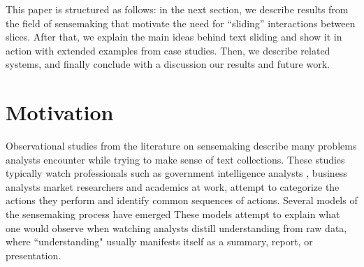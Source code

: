 \documentclass{sig-alternate}
\begin{document}
This paper is structured as follows: in the next section, we describe results from the field of sensemaking that motivate the need for ``sliding'' interactions between slices. After that, we explain the main ideas behind text sliding and show it in action with extended examples from case studies. Then, we describe related systems, and finally conclude with a discussion our results and future work.

\section{Motivation}
Observational studies from the literature on sensemaking describe many problems analysts encounter while trying to make sense of text collections. These studies typically watch professionals such as government intelligence analysts \cite{x}, business analysts \cite{x} market researchers \cite{x} and academics \cite{x} at work, attempt to categorize the actions they perform and identify common sequences of actions. Several models of the sensemaking process have emerged \cite{x} These models attempt to explain what one would observe when watching analysts distill understanding from raw data, where ``understanding" usually manifests itself as a summary, report, or presentation.
\end{document}
